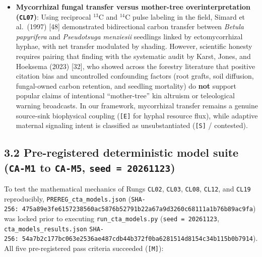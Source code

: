 \documentclass[10pt,letterpaper]{article}
\begin{document}
\begin{itemize}
  (\texttt{EODs}) illuminate shadowed objects and extend electrolocation
  range twofold to threefold.
\item
  \textbf{Mycorrhizal fungal transfer versus mother-tree
  overinterpretation (\texttt{CL07})}: Using reciprocal
  \(^{13}\mathrm{C}\) and \(^{14}\mathrm{C}\) pulse labeling in the
  field, Simard et al.~(1997) {[}48{]} demonstrated bidirectional carbon
  transfer between \emph{Betula papyrifera} and \emph{Pseudotsuga
  menziesii} seedlings linked by ectomycorrhizal hyphae, with net
  transfer modulated by shading. However, scientific honesty requires
  pairing that finding with the systematic audit by Karst, Jones, and
  Hoeksema (2023) {[}32{]}, who showed across the forestry literature
  that positive citation bias and uncontrolled confounding factors (root
  grafts, soil diffusion, fungal-owned carbon retention, and seedling
  mortality) do \textbf{not} support popular claims of intentional
  ``mother-tree'' kin altruism or teleological warning broadcasts. In
  our framework, mycorrhizal transfer remains a genuine source-sink
  biophysical coupling (\texttt{{[}E{]}} for hyphal resource flux),
  while adaptive maternal signaling intent is classified as
  unsubstantiated (\texttt{{[}S{]}} / contested).
\end{itemize}

\subsection{\texorpdfstring{3.2 Pre-registered deterministic model suite
(\texttt{CA-M1} to \texttt{CA-M5},
\texttt{seed\ =\ 20261123})}{3.2 Pre-registered deterministic model suite (CA-M1 to CA-M5, seed = 20261123)}}\label{pre-registered-deterministic-model-suite-ca-m1-to-ca-m5-seed-20261123}

To test the mathematical mechanics of Rungs \texttt{CL02},
\texttt{CL03}, \texttt{CL08}, \texttt{CL12}, and \texttt{CL19}
reproducibly, \texttt{PREREG\_\allowbreak{}cta\_\allowbreak{}models.\allowbreak{}json}
(\texttt{SHA-\allowbreak{}256:\ 475a89e3\allowbreak{}fe615723\allowbreak{}8560ac58\allowbreak{}76b52791\allowbreak{}b22a67a9\allowbreak{}d3260c68\allowbreak{}111a1b76\allowbreak{}b89ac9fa})
was locked prior to executing \texttt{run\_\allowbreak{}cta\_\allowbreak{}models.\allowbreak{}py}
(\texttt{seed\ =\ 20261123}, \texttt{cta\_\allowbreak{}models\_\allowbreak{}results.\allowbreak{}json}
\texttt{SHA-\allowbreak{}256:\ 54a7b2c1\allowbreak{}77bc063e\allowbreak{}2536ae48\allowbreak{}7cdb44b3\allowbreak{}72f0ba62\allowbreak{}81514d81\allowbreak{}54c34b11\allowbreak{}5b0b7914}).
All five pre-registered pass criteria succeeded (\texttt{{[}M{]}}):
\end{document}

